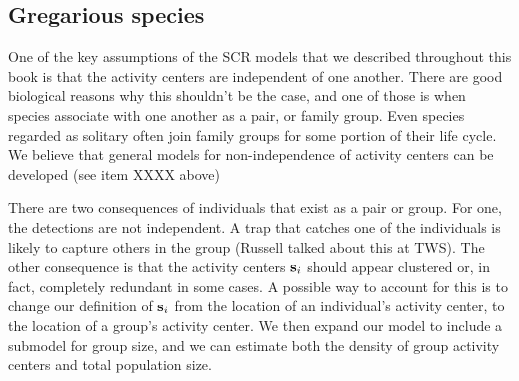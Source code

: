\subsection{Gregarious species}

One of the key assumptions of the SCR models that we described
throughout this book is that the activity centers are independent of
one another.  There are good biological reasons why this shouldn't be
the case, and one of those is when species associate with one another
as a pair, or family group.
 Even species regarded as solitary often join family
groups for some portion of their life cycle.  We believe that general
models for non-independence of activity centers can be developed (see
item XXXX above)


There are two consequences of individuals that exist as a pair or
group. For one, the detections are not independent. A trap that
catches one of the individuals is likely to capture others in the
group (Russell talked about this at TWS).
The other consequence is
that the activity centers ${\bf s}_{i}$ should appear clustered or, in
fact, completely redundant in some cases.
A possible way to account for this
is to change our definition of ${\bf s}_i$ from the
location of an individual's activity center, to the location of a
group's activity center. We then expand our model to include a
submodel for group size, and we can estimate both the density of group
activity centers and total population size.



